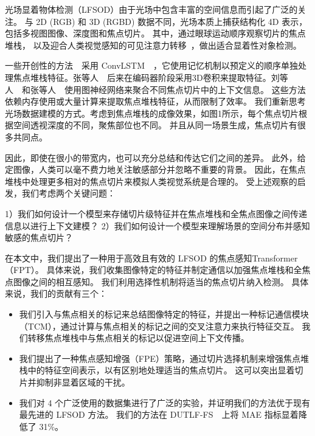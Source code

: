 
\label{chap:part3}

%
%
%
%
光场显着物体检测（LFSOD）由于光场中包含丰富的空间信息而引起了广泛的关注。
与 2D (RGB) 和 3D (RGBD) 数据不同，光场本质上捕获结构化 4D 表示，包括多视图图像、深度图和焦点切片。 其中，通过眼球运动顺序观察切片的焦点堆栈，
以及迎合人类视觉感知的可见注意力转移~\cite{piao2020dut}，做出适合显着性对象检测。

一些开创性的方法~\cite{zhang2019memory,piao2020exploit}~采用 ConvLSTM~\cite{shi2015convolutional}~，它使用记忆机制以预定义的顺序单独处理焦点堆栈特征。张等人~\cite{zhang2021learning}~后来在编码器阶段采用3D卷积来提取特征。刘等人~\cite{liu2021light}~和张等人~\cite{zhang2021geometry}~使用图神经网络来聚合不同焦点切片中的上下文信息。 这些方法依赖内存使用或大量计算来提取焦点堆栈特征，从而限制了效率。
我们重新思考光场数据建模的方式。考虑到焦点堆栈的成像效果，如图1所示，每个焦点切片根据空间透视深度的不同，聚焦部位也不同。 并且从同一场景生成，焦点切片有很多共同点。

因此，即使在很小的带宽内，也可以充分总结和传达它们之间的差异。 此外，给定图像，人类可以毫不费力地关注敏感部分并忽略不重要的背景。 因此，在焦点堆栈中处理更多相对的焦点切片来模拟人类视觉系统是合理的。 受上述观察的启发，我们考虑两个关键问题：

1）我们如何设计一个模型来存储切片级特征并在焦点堆栈和全焦点图像之间传递信息以进行上下文建模？ 
2）我们如何设计一个模型来理解场景的空间分布并感知敏感的焦点切片？ 
%
%
%
%
\par
在本文中，我们提出了一种用于高效且有效的 LFSOD 的焦点感知Transformer（FPT）。 具体来说，我们收集图像特定的特征并制定通信以加强焦点堆栈和全焦点图像之间的相互感知。 我们利用选择性机制将适当的焦点切片纳入检测。 具体来说，我们的贡献有三个：
%
%
%
%
\par
%
%
%
%
\begin{itemize}
	\item 我们引入与焦点相关的标记来总结图像特定的特征，并提出一种标记通信模块（TCM），通过计算与焦点相关的标记之间的交叉注意力来执行特征交互。 我们转移焦点堆栈中与焦点相关的标记以促进空间上下文传播。 
	
	\item 我们提出了一种焦点感知增强（FPE）策略，通过切片选择机制来增强焦点堆栈中的特征空间表示，以有区别地处理适当的焦点切片。	这可以突出显着切片并抑制非显着区域的干扰。 
	
	\item 我们对 4 个广泛使用的数据集进行了广泛的实验，并证明我们的方法优于现有最先进的 LFSOD 方法。 我们的方法在 DUTLF-FS~\cite{zhang2019memory}~上将 MAE 指标显着降低了 31\%。
\end{itemize}


